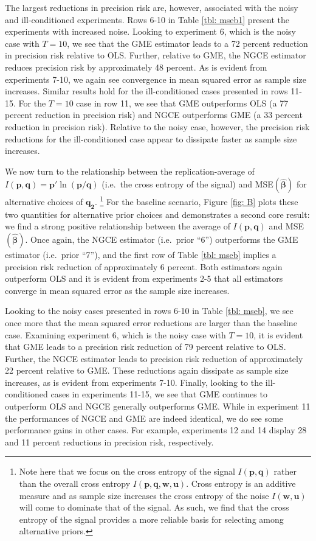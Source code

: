 \documentclass{elsarticle}
\begin{document}
The largest reductions in precision risk are, however, associated with the noisy
and ill-conditioned experiments.
Rows 6-10 in Table \ref{tbl: mseb1} present the experiments with increased 
noise. 
Looking to experiment 6, which is the noisy case with $T=10$, we see that 
the GME estimator leads to a 72 percent reduction in precision risk relative 
to OLS.
Further, relative to GME, the NGCE estimator reduces precision risk by 
approximately 48 percent. 
As is evident from experiments 7-10, we again see convergence in mean 
squared error as sample size increases.
Similar results hold for the ill-conditioned cases presented in rows 11-15.
For the $T=10$ case in row 11, we see that GME outperforms OLS 
(a 77 percent reduction in precision risk) and NGCE outperforms GME 
(a 33 percent reduction in precision risk).
Relative to the noisy case, however, the precision risk reductions for the 
ill-conditioned case appear to dissipate faster as sample size increases.

We now turn to the relationship between the replication-average of 
$I(\mathbf{p}, \mathbf{q}) = \mathbf{p}'\ln (\mathbf{p}/
\mathbf{q})$ (i.e.\ the cross entropy of the signal) and 
MSE$(\hat{\mathbf{\beta}})$ for alternative choices of $\mathbf{q_2}$.%
\footnote{Note here that we focus on the cross entropy of the signal 
$I(\mathbf{p}, \mathbf{q})$ rather than the overall cross entropy 
$I(\mathbf{p}, \mathbf{q}, \mathbf{w}, \mathbf{u})$.
Cross entropy is an additive measure and as sample size increases the cross
entropy of the noise $I(\mathbf{w}, \mathbf{u})$ will come to dominate
that of the signal.
As such, we find that the cross entropy of the signal provides a more reliable
basis for selecting among alternative priors.}
For the baseline scenario, Figure \ref{fig: B} plots these two quantities for 
alternative prior choices and demonstrates a second core result: we find a 
strong positive relationship between the average of $I(\mathbf{p}, 
\mathbf{q})$ and MSE$(\hat{\mathbf{\beta}})$.
Once again, the NGCE estimator (i.e.\ prior ``6'') outperforms the 
GME estimator (i.e.\ prior ``7''), and the first row of Table 
\ref{tbl: mseb} implies a precision risk reduction of approximately 6 
percent.
Both estimators again outperform OLS and it is evident from 
experiments 2-5 that all estimators converge in mean squared error as 
the sample size increases.

Looking to the noisy cases presented in rows 6-10 in Table 
\ref{tbl: mseb}, we see once more that the mean squared error 
reductions are larger than the baseline case. 
Examining experiment 6, which is the noisy case with $T=10$, it is 
evident that GME leads to a precision risk reduction of 79 percent
relative to OLS. 
Further, the NGCE estimator leads to precision risk reduction of 
approximately 22 percent relative to GME.
These reductions again dissipate as sample size increases, as is evident 
from experiments 7-10.
Finally, looking to the ill-conditioned cases in experiments 11-15, we see 
that GME continues to outperform OLS and NGCE generally outperforms
GME. 
While in experiment 11 the performances of NGCE and GME are indeed
identical, we do see some performance gains in other cases.
For example, experiments 12 and 14 display 28 and 11 percent reductions 
in precision risk, respectively.
\end{document}
